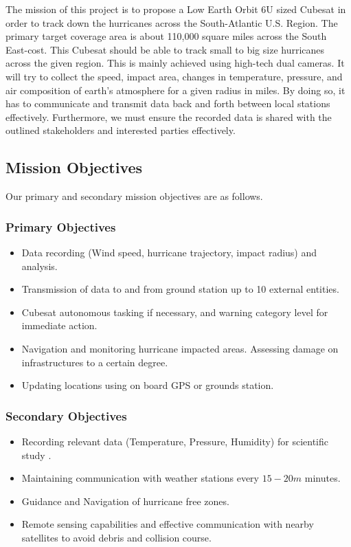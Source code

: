 The mission of this project is to propose a Low Earth Orbit 6U sized Cubesat in order to track down the hurricanes across the South-Atlantic U.S. Region. The primary target coverage area is about 110,000 square miles across the South East-cost. This Cubesat should be able to track small to big size hurricanes across the given region. This is mainly achieved using high-tech dual cameras. It will try to collect the speed, impact area,  changes in temperature, pressure, and air composition of earth’s atmosphere for a given radius in miles. By doing so, it has to communicate and transmit data back and forth between local stations effectively. Furthermore, we must ensure the recorded data is shared with the outlined stakeholders and interested parties effectively. 
\subsection{Mission Objectives }
Our primary and secondary mission objectives are as follows.
\subsubsection{Primary  Objectives}
\begin{itemize}[noitemsep]
  \item Data recording (Wind speed, hurricane trajectory, impact radius) and analysis.
  \item Transmission of data to and from ground station up to 10 external entities.
  \item Cubesat autonomous tasking if necessary, and warning category level for immediate action.
  \item Navigation and monitoring hurricane impacted areas. Assessing damage on infrastructures to a certain degree.
  \item Updating locations using on board GPS or grounds station.
\end{itemize}
\subsubsection{Secondary Objectives }
\begin{itemize}[noitemsep]
  \item Recording relevant data (Temperature, Pressure, Humidity) for scientific study  .
  \item Maintaining communication with weather stations every $15-20m$ minutes.
  \item Guidance and Navigation of hurricane free zones.
  \item Remote sensing capabilities and effective communication with nearby satellites to avoid debris and collision course. 
\end{itemize}

